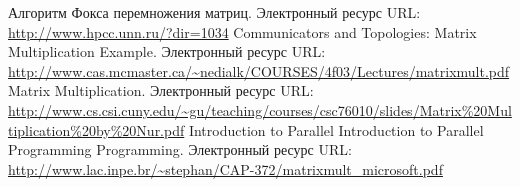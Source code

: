 \documentclass{report}
\begin{document}
\newpage


\begin{thebibliography}{}
Алгоритм Фокса перемножения матриц. Электронный ресурс \newline URL: \url{http://www.hpcc.unn.ru/?dir=1034}
Communicators and Topologies: Matrix Multiplication Example. Электронный ресурс \newline URL: \url{http://www.cas.mcmaster.ca/~nedialk/COURSES/4f03/Lectures/matrixmult.pdf}
Matrix Multiplication. Электронный ресурс \newline URL: \url{http://www.cs.csi.cuny.edu/~gu/teaching/courses/csc76010/slides/Matrix\%20Multiplication\%20by\%20Nur.pdf}
Introduction to Parallel Introduction to Parallel Programming Programming. Электронный ресурс \newline URL: \url{http://www.lac.inpe.br/~stephan/CAP-372/matrixmult_microsoft.pdf}
\end{thebibliography}

\newpage
\end{document}
